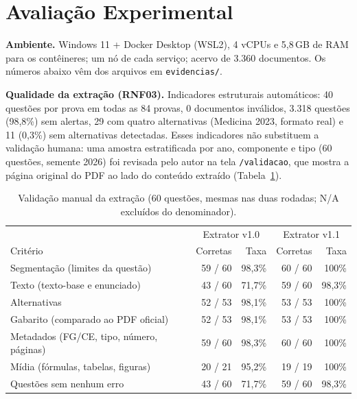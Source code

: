 \documentclass[12pt]{article}
\newcommand{\cod}[1]{\texttt{\small #1}}
\begin{document}
\section{Avaliação Experimental}\label{sec:avaliacao}

\textbf{Ambiente.} Windows 11 + Docker Desktop (WSL2), 4 vCPUs e 5,8\,GB de RAM para os contêineres; um nó de
cada serviço; acervo de 3.360 documentos. Os números abaixo vêm dos arquivos em \cod{evidencias/}.

\textbf{Qualidade da extração (RNF03).} Indicadores estruturais automáticos: 40 questões por prova em todas as
84 provas, 0 documentos inválidos, 3.318 questões (98,8\%) sem alertas, 29 com quatro alternativas
(Medicina 2023, formato real) e 11 (0,3\%) sem alternativas detectadas. Esses indicadores não substituem a
validação humana: uma amostra estratificada por ano, componente e tipo (60 questões, semente 2026) foi revisada
pelo autor na tela \cod{/validacao}, que mostra a página original do PDF ao lado do conteúdo extraído
(Tabela~\ref{tab:validacao}).

\begin{table}[ht]
\centering
\caption{Validação manual da extração (60 questões, mesmas nas duas rodadas; N/A excluídos do denominador).}\label{tab:validacao}
\small
\begin{tabular}{lrrrr}
\toprule
 & \multicolumn{2}{c}{Extrator v1.0} & \multicolumn{2}{c}{Extrator v1.1} \\
Critério & Corretas & Taxa & Corretas & Taxa \\
\midrule
Segmentação (limites da questão) & 59 / 60 & 98,3\% & 60 / 60 & 100\% \\
Texto (texto-base e enunciado) & 43 / 60 & 71,7\% & 59 / 60 & 98,3\% \\
Alternativas & 52 / 53 & 98,1\% & 53 / 53 & 100\% \\
Gabarito (comparado ao PDF oficial) & 52 / 53 & 98,1\% & 53 / 53 & 100\% \\
Metadados (FG/CE, tipo, número, páginas) & 59 / 60 & 98,3\% & 60 / 60 & 100\% \\
Mídia (fórmulas, tabelas, figuras) & 20 / 21 & 95,2\% & 19 / 19 & 100\% \\
\midrule
Questões sem nenhum erro & 43 / 60 & 71,7\% & 59 / 60 & 98,3\% \\
\bottomrule
\end{tabular}
\end{table}
\end{document}
